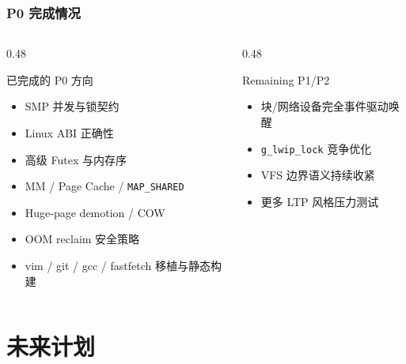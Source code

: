 \documentclass[aspectratio=1610]{beamer}
\newcommand{\code}[1]{\texttt{\footnotesize #1}}
\begin{document}
\begin{frame}
    \frametitle{P0 完成情况}
    \begin{columns}
        \begin{column}{0.48\textwidth}
            \begin{block}{已完成的 P0 方向}
                \begin{itemize}
                    \item SMP 并发与锁契约
                    \item Linux ABI 正确性
                    \item 高级 Futex 与内存序
                    \item MM / Page Cache / \code{MAP\_SHARED}
                    \item Huge-page demotion / COW
                    \item OOM reclaim 安全策略
                    \item vim / git / gcc / fastfetch 移植与静态构建
                \end{itemize}
            \end{block}
        \end{column}
        \begin{column}{0.48\textwidth}
            \begin{alertblock}{Remaining P1/P2}
                \begin{itemize}
                    \item 块/网络设备完全事件驱动唤醒
                    \item \code{g\_lwip\_lock} 竞争优化
                    \item VFS 边界语义持续收紧
                    \item 更多 LTP 风格压力测试
                \end{itemize}
            \end{alertblock}
        \end{column}
    \end{columns}
\end{frame}

\section{未来计划}
\end{document}
